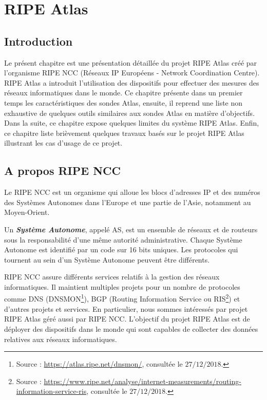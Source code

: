 
\chapter{RIPE Atlas}

\section{Introduction}



Le présent chapitre est une présentation détaillée du projet RIPE Atlas créé par l'organisme RIPE NCC (Réseaux IP Européens - Network Coordination Centre).  RIPE Atlas  a introduit l'utilisation des dispositifs pour  effectuer des mesures des réseaux informatiques dans le monde. Ce chapitre présente dans un premier temps les caractéristiques des sondes Atlas, ensuite, il  reprend une liste non exhaustive  de quelques outils similaires aux sondes Atlas en matière d'objectifs. Dans la suite, ce chapitre expose quelques limites du système RIPE Atlas. Enfin, ce chapitre  liste  brièvement quelques travaux basés sur le projet RIPE Atlas illustrant les cas d'usage de ce projet.


\section{A propos RIPE NCC}
Le RIPE NCC  est un organisme qui alloue les blocs d'adresses IP et des numéros des Systèmes Autonomes dans l'Europe et une partie de l'Asie, notamment au Moyen-Orient. 

\begin{tcolorbox}
	Un\textit{ \textbf{Système Autonome}}, appelé AS, est un ensemble de réseaux et de routeurs sous la responsabilité d'une même autorité administrative. Chaque Système Autonome est identifié par un code sur 16 bits uniques. Les protocoles qui tournent au sein d'un Système Autonome peuvent être différents.
\end{tcolorbox}

RIPE NCC assure différents services relatifs à la gestion des réseaux informatiques. Il maintient multiples projets  pour un nombre de protocoles comme DNS (DNSMON\footnote{Source : \url{https://atlas.ripe.net/dnsmon/}, consultée le $27/12/2018$.}), BGP (Routing Information Service ou RIS\footnote{Source : \url{https://www.ripe.net/analyse/internet-measurements/routing-information-service-ris}, consultée le $27/12/2018$.}) et d'autres projets et services. En particulier, nous sommes intéressés  par projet RIPE Atlas géré aussi par RIPE NCC. L'objectif du projet RIPE Atlas est de déployer des dispositifs dans le monde qui sont capables de collecter des données relatives aux réseaux informatiques. %


